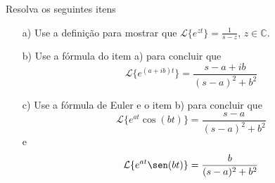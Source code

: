 \begin{exer}Resolva os seguintes itens
\begin{itemize}
 \item[a)] Use a definição para mostrar que $\mathcal{L}\{e^{zt}\}=\frac{1}{s-z}$, $z\in\mathbb{C}$.
 \item[b)] Use a fórmula do item a) para concluir que
 \begin{equation}
 \mathcal{L}\{e^{(a+ib)t}\}=\frac{s-a+ib}{(s-a)^2+b^2}
 \end{equation}
 \item[c)] Use a fórmula de Euler e o item b) para concluir que
  \begin{equation}
 \mathcal{L}\{e^{at}\cos(bt)\}=\frac{s-a}{(s-a)^2+b^2}
 \end{equation}
 e
  \begin{equation}
 \mathcal{L}\{e^{at}\sen(bt)\}=\frac{b}{(s-a)^2+b^2}
 \end{equation}
\end{itemize}
\end{exer}
